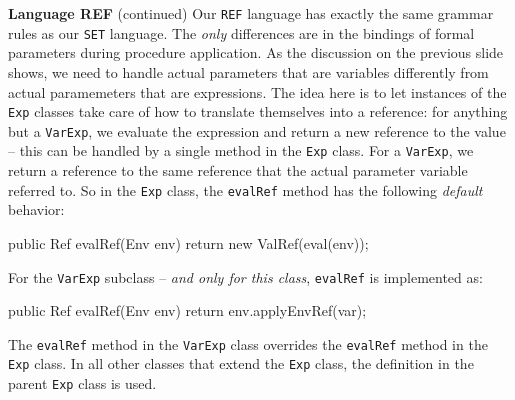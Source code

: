 \begin{minipage}[t]{\sw}
\slidenumber
\LARGE
{\bf Language REF} (continued)\exx
Our \verb'REF' language has exactly the same grammar rules
as our \verb'SET' language.
The {\em only} differences are in the bindings
of formal parameters during procedure application.
As the discussion on the previous slide shows,
we need to handle
actual parameters that are variables
differently from
actual paramemeters that are expressions.
The idea here is to let instances of the \verb'Exp' classes
take care of how to translate
themselves into a reference:
for anything but a \verb'VarExp', 
we evaluate the expression and return a new reference to the value --
this can be handled by a single method in the \verb'Exp' class.
For a \verb'VarExp',
we return a reference to the same reference
that the actual parameter variable referred to.\exx
So in the \verb'Exp' class,
the \verb'evalRef' method has the following {\em default} behavior:
\Large
\begin{qv}
public Ref evalRef(Env env) {
    return new ValRef(eval(env));
}
\end{qv}
\LARGE
For the \verb'VarExp' subclass -- {\em and only for this class},
\verb'evalRef' is implemented as:
\Large
\begin{qv}
public Ref evalRef(Env env) {
    return env.applyEnvRef(var);
}
\end{qv}
\LARGE
The \verb'evalRef' method in the \verb'VarExp' class
overrides the \verb'evalRef' method in the \verb'Exp' class.
In all other classes that extend the \verb'Exp' class,
the definition in the parent \verb'Exp' class is used.
\end{minipage}
